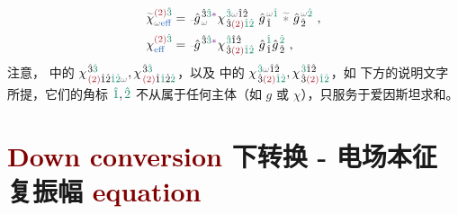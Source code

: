 \begin{subequations} \label{eq:chieff-scalar}
\begin{align}
	\textcolor{gray}{\widetilde{\textcolor{black}{\chi}}}^{\textcolor{Maroon}{(2)}\textcolor{PineGreen}{\hat{3}}}_{\mathcolor{gray}{\omega} \textcolor{NavyBlue}{\text{eff}}} &= \Xint{{}^{}_{\mathcolor{gray}{-}}}{10}{\hat{g}}^{\;\! \hat{3} \textcolor{PineGreen}{\hat{3}} \textcolor{Plum}{*}}_{\;\! \mathcolor{gray}{\omega}} {\chi}^{\;\! \textcolor{PineGreen}{\hat{3}} \mathcolor{gray}{\omega} \hat{1} \hat{2} }_{\;\! \hat{3} \textcolor{Maroon}{(2)} \textcolor{PineGreen}{\hat{1} \hat{2}}} ~ {\hat{g}}^{\;\! \mathcolor{gray}{\omega} \textcolor{PineGreen}{\hat{1}}}_{\;\! \hat{1}} ~\mathcolor{gray}{\widetilde *}~ {\hat{g}}^{\;\! \mathcolor{gray}{\omega} \textcolor{PineGreen}{\hat{2}}}_{\;\! \hat{2}} ~, \label{eq:chieff-scalar-spectrum} \\
	{\chi}^{\textcolor{Maroon}{(2)}\textcolor{PineGreen}{\hat{3}}}_{\textcolor{NavyBlue}{\text{eff}}} &= \Xint{{}^{}_{\mathcolor{gray}{-}}}{10}{\hat{g}}^{\;\! \hat{3} \textcolor{PineGreen}{\hat{3}} \textcolor{Plum}{*}}_{\;\! } {\chi}^{\;\! \textcolor{PineGreen}{\hat{3}} \hat{1} \hat{2} }_{\;\! \hat{3} \textcolor{Maroon}{(2)} \textcolor{PineGreen}{\hat{1} \hat{2}}} ~ {\hat{g}}^{\;\! \textcolor{PineGreen}{\hat{1}}}_{\;\! \hat{1}}  {\hat{g}}^{\;\! \textcolor{PineGreen}{\hat{2}}}_{\;\! \hat{2}} ~, \label{eq:chieff-scalar-discrete}
\end{align}
\end{subequations}
注意， 中的 ${\chi}^{\;\! \hat{3} \textcolor{PineGreen}{\hat{3}} }_{\;\! \textcolor{Maroon}{(2)} \hat{1} \hat{2} \textcolor{PineGreen}{\hat{1} \hat{2}} \mathcolor{gray}{\omega}}, {\chi}^{\;\! \hat{3} \textcolor{PineGreen}{\hat{3}} }_{\;\! \textcolor{Maroon}{(2)} \hat{1} \textcolor{PineGreen}{\hat{1}} \hat{2} \textcolor{PineGreen}{\hat{2}}}$，以及  中的 ${\chi}^{\;\! \textcolor{PineGreen}{\hat{3}} \mathcolor{gray}{\omega} \hat{1} \hat{2} }_{\;\! \hat{3} \textcolor{Maroon}{(2)} \textcolor{PineGreen}{\hat{1} \hat{2}}}, {\chi}^{\;\! \textcolor{PineGreen}{\hat{3}} \hat{1} \hat{2} }_{\;\! \hat{3} \textcolor{Maroon}{(2)} \textcolor{PineGreen}{\hat{1} \hat{2}}}$，如  下方的说明文字所提，它们的角标 $\textcolor{PineGreen}{\hat{1}}, \textcolor{PineGreen}{\hat{2}}$ 不从属于任何主体（如 $g$ 或 $\chi$），只服务于爱因斯坦求和。

\section{\textcolor{Maroon}{Down conversion} 下转换 - 电场本征复振幅 \textcolor{Maroon}{equation}}\label{sec:down_convert}

